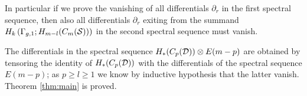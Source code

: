 In particular if we prove the vanishing of all differentials $\partial_r$
in the first spectral sequence, then also all differentials
$\partial_r$ exiting from the summand $H_k\left(\Gamma_{g,1};H_{m-l}(C_m(\mathcal{S}))\right)$ in the
second spectral sequence must vanish.

The differentials in the spectral sequence $H_*(C_p(\mathcal{D}))\otimes E(m-p)$
are obtained by tensoring the identity of $H_*(C_p(\mathcal{D}))$ with the differentials
of the spectral sequence $E(m-p)$; as $p\geq l\geq 1$ we know by inductive hypothesis
that the latter vanish. Theorem \ref{thm:main} is proved.